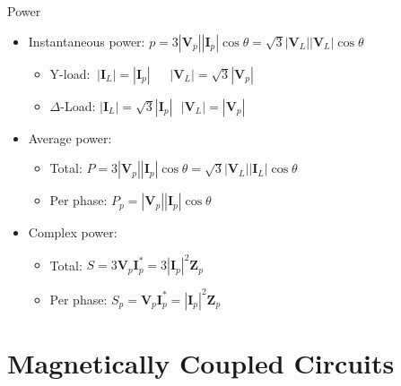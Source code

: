 \documentclass{beamer}
\begin{document}
\begin{frame}{Power}
    \begin{itemize}
        \item Instantaneous power: $p=3|\textbf{V}_p||\textbf{I}_p|\cos \theta=\sqrt{3}|\textbf{V}_L||\textbf{V}_L|\cos \theta$
            \begin{itemize}
                \item Y-load: $\ |\textbf{I}_L|=|\textbf{I}_p|\ \ \ \ \ \ \ |\textbf{V}_L|=\sqrt{3}|\textbf{V}_p|$ 
                \item $\Delta$-Load: $|\textbf{I}_L|=\sqrt{3}|\textbf{I}_p|\ \ \ |\textbf{V}_L|=|\textbf{V}_p|$
            \end{itemize}
        \item Average power: 
            \begin{itemize}
                \item Total: $P=3|\textbf{V}_p||\textbf{I}_p|\cos \theta = \sqrt{3}|\textbf{V}_L||\textbf{I}_L|\cos \theta$
                \item Per phase: $P_p=|\textbf{V}_p||\textbf{I}_p|\cos \theta$
            \end{itemize}
        \item Complex power:
            \begin{itemize}
                \item Total: $S=3\textbf{V}_p \textbf{I}_p^{*}=3|\textbf{I}_p|^2 \textbf{Z}_p$
                \item Per phase: $S_p=\textbf{V}_p \textbf{I}_p^{*}=|\textbf{I}_p|^2\textbf{Z}_p$
            \end{itemize}
    \end{itemize}
\end{frame}


\section{Magnetically Coupled Circuits}
\end{document}

